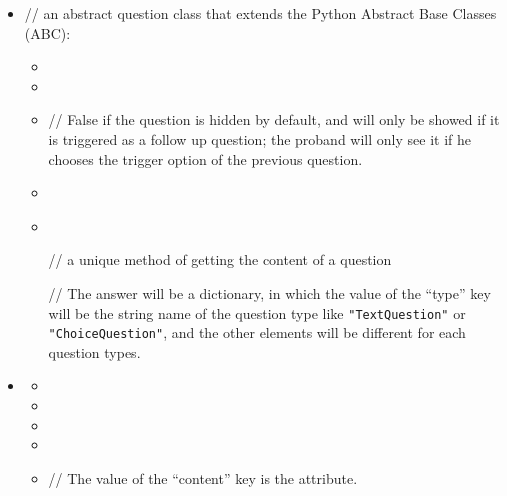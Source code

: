 \documentclass[a4paper]{scrreprt}
\begin{document}
\begin{itemize}
                    \item {}
                        \par // an abstract question class that extends the Python Abstract Base Classes (ABC): 
                        \begin{itemize}
                            \item {}
                            \item {}
                            \item {}
                                \par // False if the question is hidden by default, and will only be showed if it is triggered as a follow up question; the proband will only see it if he chooses the trigger option of the previous question.
                            \item {}
                            \item {} \\
                                \par // a unique method of getting the content of a question
                                \par // The answer will be a dictionary, in which the value of the “type” key will be the string name of the question type like \verb|"TextQuestion"| or \verb|"ChoiceQuestion"|, and the other elements will be different for each question types.
                        \end{itemize}

                    \item {}
                        \begin{itemize}
                            \item {}
                            \item {}
                            \item {}
                            \item {}
                            \item {}
                                \par // The value of the “content” key is the  attribute.
                        \end{itemize}


\end{itemize}
\end{document}

